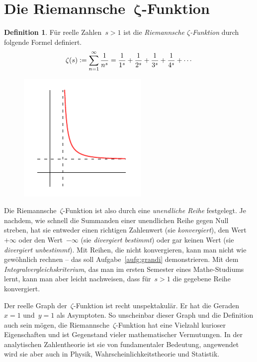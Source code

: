 \documentclass[twoside]{../zirkelblatt1415}
\theoremstyle{definition}
\newtheorem{defn}{Definition}[section]
\theoremstyle{plain}
\theoremstyle{remark}
\newcommand{\defeq}{\vcentcolon=}
\begin{document}
\section{\texorpdfstring{Die Riemannsche~$\boldsymbol{\zeta}$-Funktion}{Die
Riemannsche~ζ-Funktion}}

\begin{defn}Für reelle Zahlen~$s > 1$ ist die \emph{Riemannsche
$\zeta$-Funktion} durch folgende Formel definiert.
\[ \zeta(s) \defeq \sum_{n=1}^\infty \frac{1}{n^s} =
  \frac{1}{1^s} + \frac{1}{2^s} + \frac{1}{3^s} + \frac{1}{4^s} + \cdots \]
\end{defn}

\setlength{\wrapoverhang}{1cm}
\setlength{\columnsep}{0.5cm}
\begin{figure}
\vspace{-4em}
\includegraphics[scale=1]{zeta-function-real}
\end{figure}
Die Riemannsche~$\zeta$-Funktion ist also durch eine \emph{unendliche Reihe}
festgelegt. Je nachdem, wie schnell die Summanden einer unendlichen Reihe gegen
Null streben, hat sie entweder einen richtigen Zahlenwert (sie
\emph{konvergiert}), den Wert~$+\infty$ oder den Wert~$-\infty$ (sie
\emph{divergiert bestimmt}) oder gar keinen Wert (sie \emph{divergiert
unbestimmt}). Mit Reihen, die nicht konvergieren, kann man nicht wie gewöhnlich
rechnen -- das soll Aufgabe~\ref{aufg:grandi} demonstrieren. Mit dem
\emph{Integralvergleichskriterium}, das man im ersten Semester eines
Mathe-Studiums lernt, kann man aber leicht nachweisen, dass für~$s > 1$ die
gegebene Reihe konvergiert.

Der reelle Graph der~$\zeta$-Funktion ist recht unspektakulär. Er hat
die Geraden~$x = 1$ und~$y = 1$ als Asymptoten.
So unscheinbar dieser Graph und die Definition auch sein mögen, die Riemannsche~$\zeta$-Funktion
hat eine Vielzahl kurioser Eigenschaften und ist Gegenstand vieler
mathematischer Vermutungen. In der analytischen Zahlentheorie ist sie von
fundamentaler Bedeutung, angewendet wird sie aber auch in Physik,
Wahrscheinlichkeitstheorie und Statistik.
\end{document}
